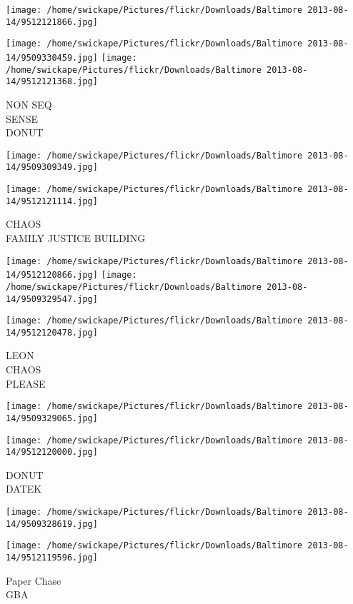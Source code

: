 \documentclass[10pt,letterpaper]{article}
\begin{document}
\texttt{[image: /home/swickape/Pictures/flickr/Downloads/Baltimore 2013-08-14/9512121866.jpg]}

\vspace{0.25in}
\texttt{[image: /home/swickape/Pictures/flickr/Downloads/Baltimore 2013-08-14/9509330459.jpg]}
\texttt{[image: /home/swickape/Pictures/flickr/Downloads/Baltimore 2013-08-14/9512121368.jpg]}

NON SEQ\\
SENSE\\
DONUT
\pagebreak

\texttt{[image: /home/swickape/Pictures/flickr/Downloads/Baltimore 2013-08-14/9509309349.jpg]}

\vspace{0.25in}
\texttt{[image: /home/swickape/Pictures/flickr/Downloads/Baltimore 2013-08-14/9512121114.jpg]}

CHAOS\\
FAMILY JUSTICE BUILDING
\pagebreak

\texttt{[image: /home/swickape/Pictures/flickr/Downloads/Baltimore 2013-08-14/9512120866.jpg]}
\texttt{[image: /home/swickape/Pictures/flickr/Downloads/Baltimore 2013-08-14/9509329547.jpg]}

\vspace{0.25in}
\texttt{[image: /home/swickape/Pictures/flickr/Downloads/Baltimore 2013-08-14/9512120478.jpg]}

LEON\\
CHAOS\\
PLEASE
\pagebreak

\texttt{[image: /home/swickape/Pictures/flickr/Downloads/Baltimore 2013-08-14/9509329065.jpg]}

\vspace{0.25in}
\texttt{[image: /home/swickape/Pictures/flickr/Downloads/Baltimore 2013-08-14/9512120000.jpg]}

DONUT\\
DATEK
\pagebreak

\texttt{[image: /home/swickape/Pictures/flickr/Downloads/Baltimore 2013-08-14/9509328619.jpg]}

\vspace{0.25in}
\texttt{[image: /home/swickape/Pictures/flickr/Downloads/Baltimore 2013-08-14/9512119596.jpg]}

Paper Chase\\
GBA
\pagebreak
\end{document}
